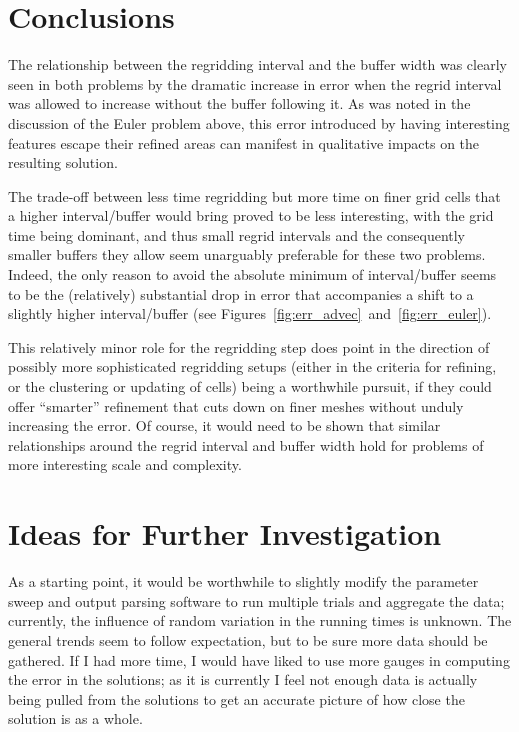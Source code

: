 \documentclass[11pt]{article}
\begin{document}
\section*{Conclusions}
The relationship between the regridding interval and the buffer width
was clearly seen in both problems by the dramatic increase in error
when the regrid interval was allowed to increase without the buffer
following it. As was noted in the discussion of the Euler problem above,
this error introduced by having interesting features escape their
refined areas can manifest in qualitative impacts on the resulting
solution.

The trade-off between less time regridding but more time on finer
grid cells that a higher interval/buffer would bring proved to be
less interesting, with the grid time being dominant, and thus small
regrid intervals and the consequently smaller buffers they allow
seem unarguably preferable for these two problems. Indeed, the only
reason to avoid the absolute minimum of interval/buffer seems to be 
the (relatively) substantial drop in error that accompanies a shift to a slightly
higher interval/buffer (see Figures~\ref{fig:err_advec}~and~\ref{fig:err_euler}).

This relatively minor role for the regridding step does point in
the direction of possibly more sophisticated regridding setups 
(either in the criteria for refining, or the clustering or 
updating of cells) being a worthwhile pursuit, if they could offer
``smarter'' refinement that cuts down on finer meshes without
unduly increasing the error. Of course, it would need to be shown
that similar relationships around the regrid interval and buffer
width hold for problems of more interesting scale and complexity.

\section*{Ideas for Further Investigation}
As a starting point, it would be worthwhile to slightly modify the
parameter sweep and output parsing software to run multiple trials 
and aggregate the data; currently, the influence of random variation
in the running times is unknown. The general trends seem to follow 
expectation, but to be sure more data should be gathered. If I had more time,
I would have liked to use more gauges in computing the error in the solutions;
as it is currently I feel not enough data is actually being pulled from
the solutions to get an accurate picture of how close the solution is as
a whole.
\end{document}
